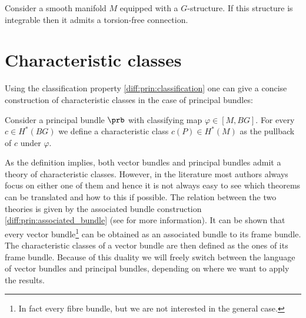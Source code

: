     \begin{property}\label{diff:prin:integrable_torsion_free}
        Consider a smooth manifold $M$ equipped with a $G$-structure. If this structure is integrable then it admits a torsion-free connection.
    \end{property}

\section{Characteristic classes}

    Using the classification property \ref{diff:prin:classification} one can give a concise construction of characteristic classes in the case of principal bundles:
    \begin{construct}
        Consider a principal bundle $\prb$ with classifying map $\varphi\in[M, BG]$. For every $c\in H^*(BG)$ we define a characteristic class $c(P)\in H^*(M)$ as the pullback of $c$ under $\varphi$.
    \end{construct}

    As the definition implies, both vector bundles and principal bundles admit a theory of characteristic classes. However, in the literature most authors always focus on either one of them and hence it is not always easy to see which theorems can be translated and how to this if possible. The relation between the two theories is given by the associated bundle construction \ref{diff:prin:associated_bundle} (see \cite{sorensen} for more information). It can be shown that every vector bundle\footnote{In fact every fibre bundle, but we are not interested in the general case.} can be obtained as an associated bundle to its frame bundle. The characteristic classes of a vector bundle are then defined as the ones of its frame bundle. Because of this duality we will freely switch between the language of vector bundles and principal bundles, depending on where we want to apply the results.

